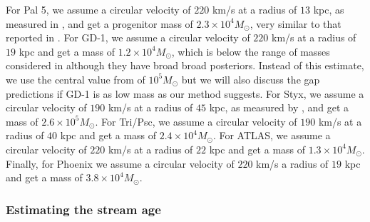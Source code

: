\documentclass[useAMS,usenatbib]{mn2e}
\begin{document}
For Pal 5, we assume a circular velocity of $220$ km/s at a radius of $13$ kpc, as measured in \cite{bovy_et_al_2012}, and get a progenitor mass of $2.3 \times 10^4 M_\odot$, very similar to that reported in \cite{kuepper_et_al_pal5}. For GD-1, we assume a circular velocity of $220$ km/s at a radius of $19$ kpc and get a mass of $1.2 \times 10^4 M_\odot$, which is below the range of masses considered in \cite{bowden_et_al_gd1} although they have broad broad posteriors. Instead of this estimate, we use the central value from \cite{bowden_et_al_gd1} of $10^5 M_\odot$ but we will also discuss the gap predictions if GD-1 is as low mass as our method suggests. For Styx, we assume a circular velocity of $190$ km/s at a radius of $45$ kpc, as measured by \cite{deason_et_al_2012}, and get a mass of $2.6 \times 10^5 M_\odot$. For Tri/Psc, we assume a circular velocity of $190$ km/s at a radius of $40$ kpc and get a mass of $2.4\times 10^4 M_\odot$. For ATLAS, we assume a circular velocity of $220$ km/s at a radius of $22$ kpc and get a mass of $1.3 \times 10^4 M_\odot$. Finally, for Phoenix we assume a circular velocity of $220$ km/s a radius of $19$ kpc and get a mass of $3.8 \times 10^4 M_\odot$. 

\subsubsection{Estimating the stream age}
\end{document}
